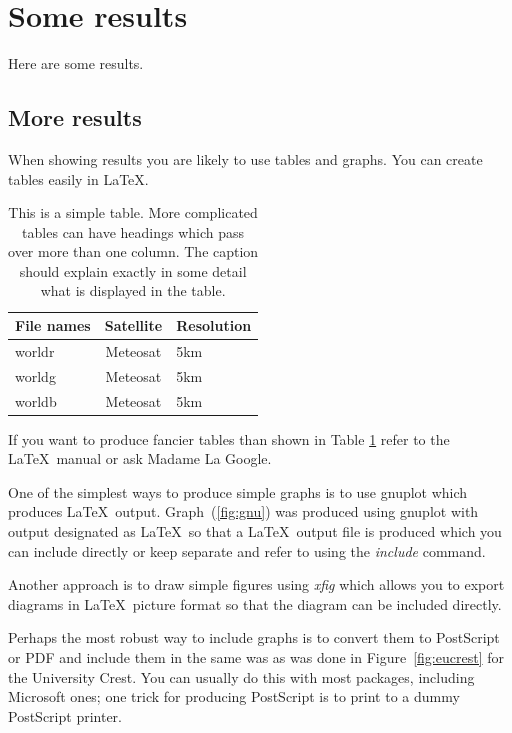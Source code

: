 \documentclass[12pt,a4paper]{report}
\begin{document}
\section{Some results}
Here are some results.

\subsection{More results}
When showing results you are likely to use tables and graphs. You can
create tables easily in \LaTeX.

\begin{table}[h]
\begin{center}
\begin{tabular}{||l|c|l||}
\hline
\textbf{File names} & \textbf{Satellite} & \textbf{Resolution}\\
\hline
  worldr            &  Meteosat          &   5km\\
  worldg            &  Meteosat          &   5km\\
  worldb            &  Meteosat          &   5km\\
\hline
\end{tabular}
\end{center}
\caption{This is a simple table. More complicated tables can have
  headings which pass over more than one column. The caption should
  explain exactly in some detail what is displayed in the table.}
\label{simple_table}
\end{table}

If you want to produce fancier tables than shown in Table \ref{simple_table}
refer to the \LaTeX\ manual or ask Madame La Google.

One of the simplest ways to produce simple graphs is to use gnuplot
which produces \LaTeX\  output. Graph~(\ref{fig:gnu}) was produced using
gnuplot with output designated as \LaTeX\  so that a \LaTeX\  output file is
produced which you can include directly or keep separate and refer to
using the \emph{include} command.

Another approach is to draw simple figures using \emph{xfig} which allows
you to export diagrams in \LaTeX\  picture format so that the diagram can
be included directly.

Perhaps the most robust way to include graphs is to convert them to
PostScript or PDF and include them in the same was as was done in
Figure~\ref{fig:eucrest} for the University Crest. You can usually do
this with most packages, including Microsoft ones; one trick for
producing PostScript is to print to a dummy PostScript printer.
\end{document}
